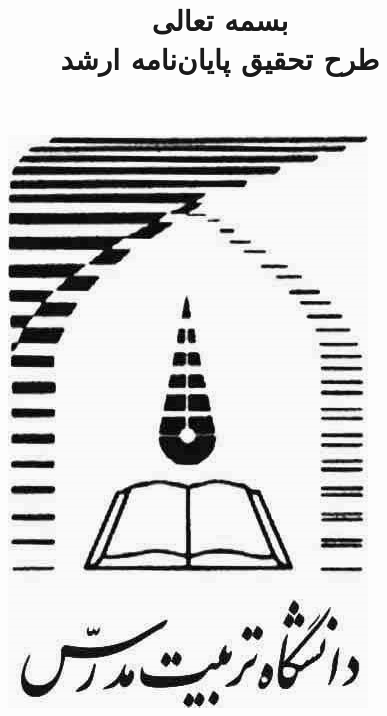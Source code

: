 \begin{minipage}[t][0.2\textheight][t]{0.3\textwidth}
	\begin{figure}[H]
		\raggedleft
		\includegraphics[scale = 0.5]{Figures/modares.jpg}
		\label{fig:modares-logo}
	\end{figure}
\end{minipage}
\title{
	بسمه تعالی
	\\
	طرح تحقیق پایان‌نامه ارشد
}
\date{}
\author{}
\begin{minipage}[t][0.1\textheight][t]{0.5\textwidth}
	\maketitle
\end{minipage}